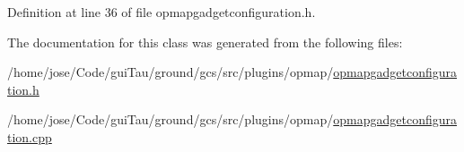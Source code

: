 Definition at line 36 of file opmapgadgetconfiguration.\-h.



The documentation for this class was generated from the following files\-:\begin{DoxyCompactItemize}
\item 
/home/jose/\-Code/gui\-Tau/ground/gcs/src/plugins/opmap/\hyperlink{opmapgadgetconfiguration_8h}{opmapgadgetconfiguration.\-h}\item 
/home/jose/\-Code/gui\-Tau/ground/gcs/src/plugins/opmap/\hyperlink{opmapgadgetconfiguration_8cpp}{opmapgadgetconfiguration.\-cpp}\end{DoxyCompactItemize}
